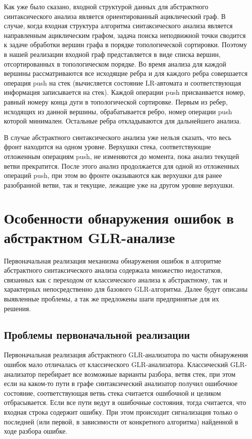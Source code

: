 Как уже было сказано, входной структурой данных для абстрактного синтаксического 
анализа является ориентированный ациклический граф. В случае, когда входная структура 
алгоритма синтаксического анализа является направленным ациклическим графом, задача 
поиска неподвижной точки сводится к задаче обработки вершин графа в порядке 
топологической сортировки. Поэтому в нашей реализации входной граф представляется 
в виде списка вершин, отсортированных в топологическом порядке. Во время анализа 
для каждой вершины рассматриваются все исходящие ребра и для каждого ребра 
совершается операция push на стек (вычисляется состояние LR-автомата и соответствующая 
информация записывается на стек). Каждой операции push присваивается номер, равный
номеру конца дуги в топологической сортировке. Первым из ребер, исходящих из данной 
вершины, обрабатывается ребро, номер операции push которой минимален. Остальные 
ребра откладываются для дальнейшего анализа. 

В случае абстрактного синтаксического анализа уже нельзя сказать, что весь фронт 
находится на одном уровне. Верхушки стека, соответствующие отложенным операциям 
push, не изменяются до момента, пока анализ текущей ветви прекратится. После этого 
анализ продолжается для одной из отложенных операций push, при этом во фронте 
оказываются как верхушки для ранее разобранной ветви, так и текущие, лежащие уже 
на другом уровне верхушки.


\section{Особенности обнаружения ошибок в абстрактном GLR-анализе}
Первоначальная реализация механизма обнаружения ошибок в алгоритме абстрактного 
синтаксического анализа содержала множество недостатков, связанных как с переходом 
от классического анализа к абстрактному, так и характерных непосредственно для 
базового GLR-алгоритма. Далее будут описаны выявленные проблемы, а так же предложены 
шаги предпринятые для их решения.

\subsection{Проблемы первоначальной реализации}
Первоначальная реализация абстрактного GLR-анализатора по части обнаружения ошибок 
мало отличалась от классического GLR-анализатора. Классический GLR-анализатор 
перебирает все возможные варианты разбора, ветвя стек, при этом если на каком-то 
пути в графе синтаксический анализатор получил ошибочное  состояние, соответствующая 
ветвь стека считается ошибочной и целиком отбрасывается. Если все пути ведут в 
ошибочные состояния, тогда считается, что входная строка содержит ошибку. При этом 
происходит сигнализация только о последней (или первой, в зависимости от конкретного 
алгоритма) найденной в ходе разбора ошибке. 

